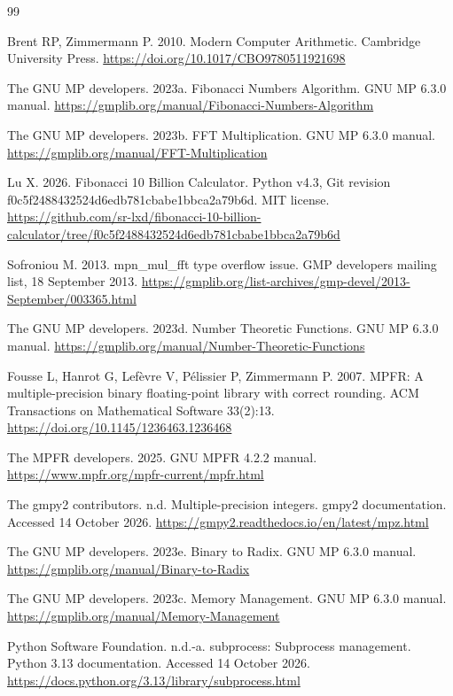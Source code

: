 \documentclass[11pt,a4paper]{article}
\begin{document}
\begin{thebibliography}{99}
\raggedright
{} Brent RP, Zimmermann P. 2010. Modern Computer Arithmetic. Cambridge University Press. \url{https://doi.org/10.1017/CBO9780511921698}

 The GNU MP developers. 2023a. Fibonacci Numbers Algorithm. GNU MP 6.3.0 manual. \url{https://gmplib.org/manual/Fibonacci-Numbers-Algorithm}

 The GNU MP developers. 2023b. FFT Multiplication. GNU MP 6.3.0 manual. \url{https://gmplib.org/manual/FFT-Multiplication}

 Lu X. 2026. Fibonacci 10 Billion Calculator. Python v4.3, Git revision f0c5f2488432524d6edb781cbabe1bbca2a79b6d. MIT license. \url{https://github.com/sr-lxd/fibonacci-10-billion-calculator/tree/f0c5f2488432524d6edb781cbabe1bbca2a79b6d}

 Sofroniou M. 2013. mpn\_\allowbreak{}mul\_\allowbreak{}fft type overflow issue. GMP developers mailing list, 18 September 2013. \url{https://gmplib.org/list-archives/gmp-devel/2013-September/003365.html}

 The GNU MP developers. 2023d. Number Theoretic Functions. GNU MP 6.3.0 manual. \url{https://gmplib.org/manual/Number-Theoretic-Functions}

 Fousse L, Hanrot G, Lefèvre V, Pélissier P, Zimmermann P. 2007. MPFR: A multiple-precision binary floating-point library with correct rounding. ACM Transactions on Mathematical Software 33(2):13. \url{https://doi.org/10.1145/1236463.1236468}

 The MPFR developers. 2025. GNU MPFR 4.2.2 manual. \url{https://www.mpfr.org/mpfr-current/mpfr.html}

 The gmpy2 contributors. n.d. Multiple-precision integers. gmpy2 documentation. Accessed 14 October 2026. \url{https://gmpy2.readthedocs.io/en/latest/mpz.html}

 The GNU MP developers. 2023e. Binary to Radix. GNU MP 6.3.0 manual. \url{https://gmplib.org/manual/Binary-to-Radix}

 The GNU MP developers. 2023c. Memory Management. GNU MP 6.3.0 manual. \url{https://gmplib.org/manual/Memory-Management}

 Python Software Foundation. n.d.-a. subprocess: Subprocess management. Python 3.13 documentation. Accessed 14 October 2026. \url{https://docs.python.org/3.13/library/subprocess.html}


\end{thebibliography}
\end{document}

